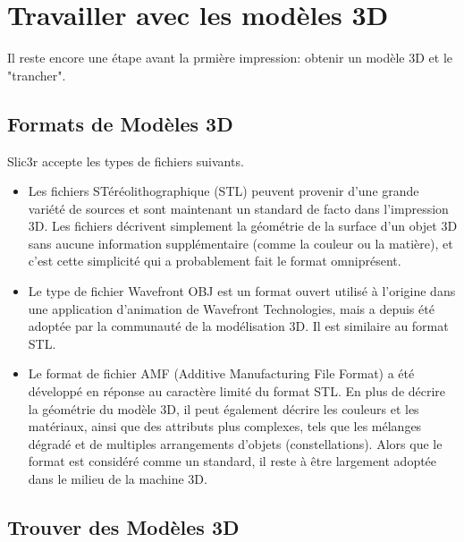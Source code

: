 \section{Travailler avec les mod\`eles 3D}
\label{sub:working_with_models}

Il reste encore une \'etape avant la prmi\`ere impression: obtenir un mod\`ele 3D et le "trancher".

\subsection{Formats de Mod\`eles 3D} %
\label{sub:model_formats}

Slic3r accepte les types de fichiers suivants.

\begin{itemize}
	\item Les fichiers ST\'er\'eolithographique (STL) peuvent provenir d'une grande vari\'et\'e de sources et sont maintenant un standard de facto dans l'impression 3D. Les fichiers d\'ecrivent simplement la g\'eom\'etrie de la surface d'un objet 3D sans aucune information suppl\'ementaire (comme la couleur ou la mati\`ere), et c'est cette simplicit\'e qui a probablement fait le format omnipr\'esent.
	\item Le type de fichier Wavefront OBJ est un format ouvert utilis\'e \`a l'origine dans une application d'animation de Wavefront Technologies, mais a depuis \'et\'e adopt\'ee par la communaut\'e de la mod\'elisation 3D. Il est similaire au format STL.
	\item Le format de fichier AMF (Additive Manufacturing File Format) a \'et\'e d\'evelopp\'e en r\'eponse au caract\`ere limit\'e du format STL. En plus de d\'ecrire la g\'eom\'etrie du mod\`ele 3D, il peut \'egalement d\'ecrire les couleurs et les mat\'eriaux, ainsi que des attributs plus complexes, tels que les m\'elanges d\'egrad\'e et de multiples arrangements d'objets (constellations). Alors que le format est consid\'er\'e comme un standard, il reste \`a \^etre largement adopt\'ee dans le milieu de la machine 3D.
\end{itemize}

\subsection{Trouver des Mod\`eles 3D} %
\label{sub:finding_models}

